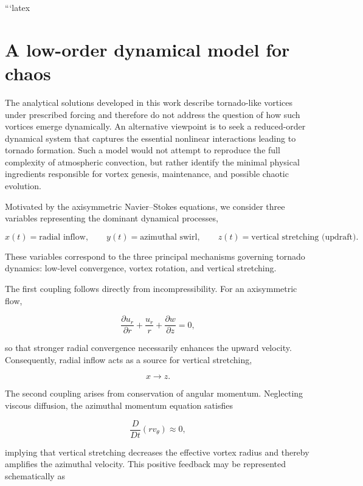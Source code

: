 ```latex
\section{A low-order dynamical model for chaos}

The analytical solutions developed in this work describe tornado-like vortices under prescribed forcing and therefore do not address the question of how such vortices emerge dynamically. An alternative viewpoint is to seek a reduced-order dynamical system that captures the essential nonlinear interactions leading to tornado formation. Such a model would not attempt to reproduce the full complexity of atmospheric convection, but rather identify the minimal physical ingredients responsible for vortex genesis, maintenance, and possible chaotic evolution.

Motivated by the axisymmetric Navier--Stokes equations, we consider three variables representing the dominant dynamical processes,

\begin{equation}
x(t) = \text{radial inflow},
\qquad
y(t) = \text{azimuthal swirl},
\qquad
z(t) = \text{vertical stretching (updraft)}.
\end{equation}

These variables correspond to the three principal mechanisms governing tornado dynamics: low-level convergence, vortex rotation, and vertical stretching.

The first coupling follows directly from incompressibility. For an axisymmetric flow,

\begin{equation}
\frac{\partial u_r}{\partial r}
+
\frac{u_r}{r}
+
\frac{\partial w}{\partial z}
=
0,
\end{equation}

so that stronger radial convergence necessarily enhances the upward velocity. Consequently, radial inflow acts as a source for vertical stretching,

\begin{equation}
x \longrightarrow z.
\end{equation}

The second coupling arises from conservation of angular momentum. Neglecting viscous diffusion, the azimuthal momentum equation satisfies

\begin{equation}
\frac{D}{Dt}(r v_\theta)
\approx
0,
\end{equation}

implying that vertical stretching decreases the effective vortex radius and thereby amplifies the azimuthal velocity. This positive feedback may be represented schematically as

